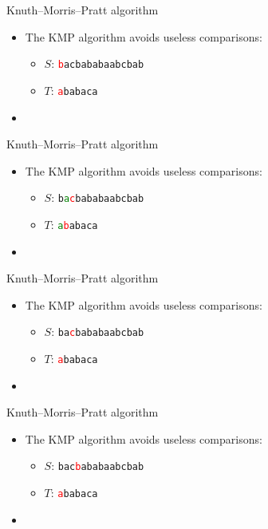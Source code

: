 \documentclass{beamer}
\begin{document}
	\begin{frame}[plain]{Knuth--Morris--Pratt algorithm}
		\begin{itemize}
			\item The KMP algorithm avoids useless comparisons:
			\begin{itemize}
				\item $S$: \texttt{\textcolor{red}{b}acbababaabcbab}
				\item $T$: \phantom{\texttt{}}\texttt{\textcolor{red}{a}babaca}
			\end{itemize}
			\item[] \phantom{The number of shifts depend on which characters are currently matched}
		\end{itemize}
	\end{frame}
	\begin{frame}[plain]{Knuth--Morris--Pratt algorithm}
		\begin{itemize}
			\item The KMP algorithm avoids useless comparisons:
			\begin{itemize}
				\item $S$: \texttt{b\textcolor{green}{a}\textcolor{red}{c}bababaabcbab}
				\item $T$: \texttt{\textcolor{green}{a}\textcolor{red}{b}abaca}
			\end{itemize}
			\item[] \phantom{The number of shifts depend on which characters are currently matched}
		\end{itemize}
	\end{frame}
	\begin{frame}[plain]{Knuth--Morris--Pratt algorithm}
		\begin{itemize}
			\item The KMP algorithm avoids useless comparisons:
			\begin{itemize}
				\item $S$: \texttt{ba\textcolor{red}{c}bababaabcbab}
				\item $T$: \texttt{\textcolor{red}{a}babaca}
			\end{itemize}
			\item[] \phantom{The number of shifts depend on which characters are currently matched}
		\end{itemize}
	\end{frame}
	\begin{frame}[plain]{Knuth--Morris--Pratt algorithm}
		\begin{itemize}
			\item The KMP algorithm avoids useless comparisons:
			\begin{itemize}
				\item $S$: \texttt{bac\textcolor{red}{b}ababaabcbab}
				\item $T$: \texttt{\textcolor{red}{a}babaca}
			\end{itemize}
			\item[] \phantom{The number of shifts depend on which characters are currently matched}
		\end{itemize}
	\end{frame}
\end{document}
